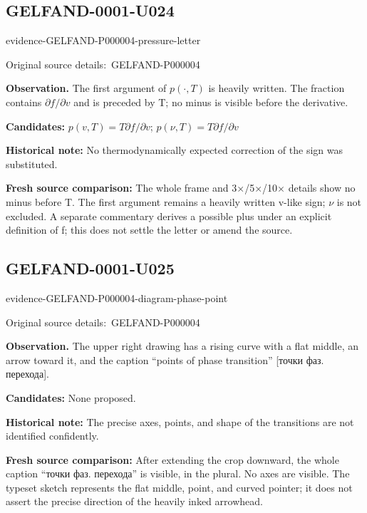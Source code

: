 \documentclass[11pt]{article}
\newcommand{\EvidenceBlock}[4]{%
 \par\smallskip\noindent\begin{minipage}{\linewidth}
 \begin{minipage}[t]{.47\linewidth}\vspace{0pt}\centering
 \csname evidence-#1-#2\endcsname\par
 {\scriptsize\SourceCropCaption\ #1}\par
 \end{minipage}\hfill
 \begin{minipage}[t]{.49\linewidth}\vspace{0pt}\raggedright
 {\small\color{orange!65!black}\textbf{#4} #3}\par
 \end{minipage}
 \end{minipage}\par\smallskip}
\newcommand{\SourceCropCaption}{Original source details:}\newcommand{\ReadingCaption}{Uncertain reading.}\newcommand{\IncompleteCaption}{Undeciphered passage.}\newcommand{\DiagramCaption}{Diagram and typed description.}
\begin{document}
\subsection*{GELFAND-0001-U024}
\EvidenceBlock{GELFAND-P000004}{pressure-letter}{The first argument of \(p(\cdot,T)\) is heavily written. The fraction contains \(\partial f/\partial v\) and is preceded by T; no minus is visible before the derivative.}{Observation.}
\par\smallskip\noindent\textbf{Candidates: } \(p(v,T)=T\partial f/\partial v\); \(p(\nu,T)=T\partial f/\partial v\)\par
\par\smallskip\noindent\textbf{Historical note: } No thermodynamically expected correction of the sign was substituted.\par
\par\smallskip\noindent\textbf{Fresh source comparison: } The whole frame and 3×/5×/10× details show no minus before T. The first argument remains a heavily written v-like sign; \(\nu\) is not excluded. A separate commentary derives a possible plus under an explicit definition of f; this does not settle the letter or amend the source.\par

\subsection*{GELFAND-0001-U025}
\EvidenceBlock{GELFAND-P000004}{diagram-phase-point}{The upper right drawing has a rising curve with a flat middle, an arrow toward it, and the caption “points of phase transition” [точки фаз. перехода].}{Observation.}
\par\smallskip\noindent\textbf{Candidates: } None proposed.\par
\par\smallskip\noindent\textbf{Historical note: } The precise axes, points, and shape of the transitions are not identified confidently.\par
\par\smallskip\noindent\textbf{Fresh source comparison: } After extending the crop downward, the whole caption “точки фаз. перехода” is visible, in the plural. No axes are visible. The typeset sketch represents the flat middle, point, and curved pointer; it does not assert the precise direction of the heavily inked arrowhead.\par
\end{document}
